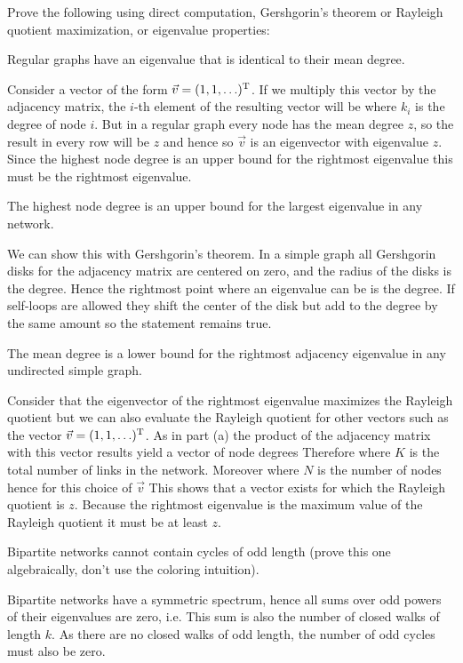 Prove the following using direct computation, Gershgorin's theorem or Rayleigh quotient maximization, or eigenvalue properties:

\subquestion Regular graphs have an eigenvalue that is identical to their mean degree. 

\solution 
Consider a vector of the form $\vec{v}=(1,1,\ldots)^{\rm T}$. If we multiply this vector by the adjacency matrix, the $i$-th element of the resulting vector will be 
where $k_i$ is the degree of node $i$. But in a regular graph every node has the mean degree $z$, so the result in every row will be $z$ and hence 
so $\vec{v}$ is an eigenvector with eigenvalue $z$. Since the highest node degree is an upper bound for the rightmost eigenvalue this must be the rightmost eigenvalue. 

\subquestion The highest node degree is an upper bound for the largest eigenvalue in any network. 

\solution
We can show this with Gershgorin's theorem. In a simple graph all Gershgorin disks for the adjacency matrix are centered on zero, and the radius of the disks is the degree. Hence the rightmost point where an eigenvalue can be is the degree. If self-loops are allowed they shift the center of the disk but add to the degree by the same amount so the statement remains true. 

\subquestion The mean degree is a lower bound for the rightmost adjacency eigenvalue in any undirected simple graph.

\solution
Consider that the eigenvector of the rightmost eigenvalue maximizes the Rayleigh quotient 
but we can also evaluate the Rayleigh quotient for other vectors such as the vector $\vec{v}=(1,1,\ldots)^{\rm T}$. As in part (a) the product of the adjacency matrix with this vector results yield a vector of node degrees
Therefore 
where $K$ is the total number of links in the network. Moreover 
where $N$ is the number of nodes hence for this choice of $\vec{v}$ 
This shows that a vector exists for which the Rayleigh quotient is $z$.  
Because the rightmost eigenvalue is the maximum value of the Rayleigh quotient it must be at least $z$.

\subquestion Bipartite networks cannot contain cycles of odd length (prove this one algebraically, don't use the coloring intuition).

\solution
Bipartite networks have a symmetric spectrum, hence all sums over odd powers of their eigenvalues are zero, i.e. 
This sum is also the number of closed walks of length $k$. As there are no closed walks of odd length, the number of odd cycles must also be zero.  




